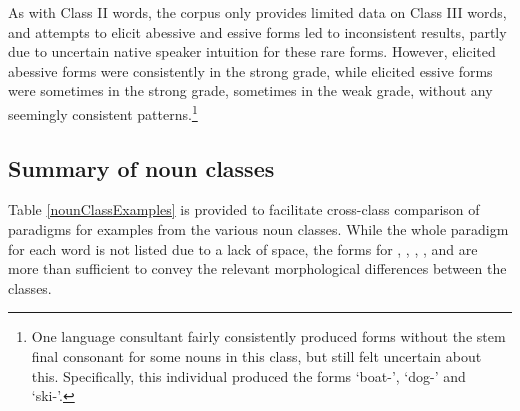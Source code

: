 As with Class II words, the corpus only provides limited data on Class III words, and attempts to elicit abessive and essive forms led to inconsistent results, partly due to uncertain native speaker intuition for these rare forms. However, elicited abessive forms were consistently in the strong grade, while elicited essive forms were sometimes in the strong grade, sometimes in the weak grade, without any seemingly consistent patterns.\footnote{One language consultant fairly consistently produced  forms without the stem final consonant for some nouns in this class, but still felt uncertain about this. Specifically, this individual produced the forms  ‘boat-’,  ‘dog-’ and  ‘ski-’.} 

\FB
\vfill
\hbox{}

\subsection{Summary of noun classes}\label{summaryNounClasses}
Table \vref{nounClassExamples} is provided to facilitate cross-class comparison of paradigms for examples from the various noun classes. While the whole paradigm for each word is not listed due to a lack of space, the forms for , , , ,  and  are more than sufficient to convey the relevant morphological differences between the classes.


